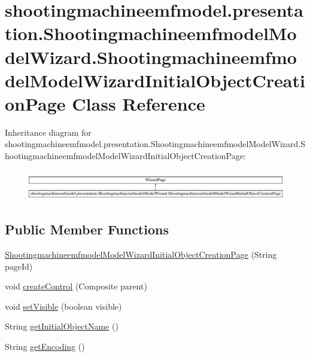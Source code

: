 \hypertarget{classshootingmachineemfmodel_1_1presentation_1_1_shootingmachineemfmodel_model_wizard_1_1_shootia3fbc6bd8d9af3fefbb57f601e613dce}{\section{shootingmachineemfmodel.\-presentation.\-Shootingmachineemfmodel\-Model\-Wizard.\-Shootingmachineemfmodel\-Model\-Wizard\-Initial\-Object\-Creation\-Page Class Reference}
\label{classshootingmachineemfmodel_1_1presentation_1_1_shootingmachineemfmodel_model_wizard_1_1_shootia3fbc6bd8d9af3fefbb57f601e613dce}
}
Inheritance diagram for shootingmachineemfmodel.\-presentation.\-Shootingmachineemfmodel\-Model\-Wizard.\-Shootingmachineemfmodel\-Model\-Wizard\-Initial\-Object\-Creation\-Page\-:\begin{figure}[H]
\begin{center}
\leavevmode
\includegraphics[height=1.338112cm]{classshootingmachineemfmodel_1_1presentation_1_1_shootingmachineemfmodel_model_wizard_1_1_shootia3fbc6bd8d9af3fefbb57f601e613dce}
\end{center}
\end{figure}
\subsection*{Public Member Functions}
\begin{DoxyCompactItemize}
\item 
\hyperlink{classshootingmachineemfmodel_1_1presentation_1_1_shootingmachineemfmodel_model_wizard_1_1_shootia3fbc6bd8d9af3fefbb57f601e613dce_a5d51d0012f768a5c78dd3a3c2ca88a5c}{Shootingmachineemfmodel\-Model\-Wizard\-Initial\-Object\-Creation\-Page} (String page\-Id)
\item 
void \hyperlink{classshootingmachineemfmodel_1_1presentation_1_1_shootingmachineemfmodel_model_wizard_1_1_shootia3fbc6bd8d9af3fefbb57f601e613dce_aef9fc5b1c09f8e03bfc72725b812d7c1}{create\-Control} (Composite parent)
\item 
void \hyperlink{classshootingmachineemfmodel_1_1presentation_1_1_shootingmachineemfmodel_model_wizard_1_1_shootia3fbc6bd8d9af3fefbb57f601e613dce_a01e53ffd6638f21b68738d1c0bf354ab}{set\-Visible} (boolean visible)
\item 
String \hyperlink{classshootingmachineemfmodel_1_1presentation_1_1_shootingmachineemfmodel_model_wizard_1_1_shootia3fbc6bd8d9af3fefbb57f601e613dce_a42682fce9107e7de57843dcdd55152d7}{get\-Initial\-Object\-Name} ()
\item 
String \hyperlink{classshootingmachineemfmodel_1_1presentation_1_1_shootingmachineemfmodel_model_wizard_1_1_shootia3fbc6bd8d9af3fefbb57f601e613dce_ac5551a1fac8b46f0c37d9e39e1a1dcf7}{get\-Encoding} ()
\end{DoxyCompactItemize}
